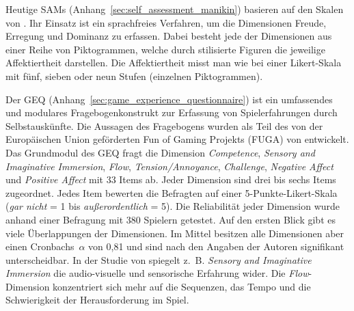 Heutige \ac{SAM}s (Anhang~\ref{sec:self_assessment_manikin}) basieren auf den Skalen von \citet{Lang1980}. Ihr Einsatz ist ein sprachfreies Verfahren, um die Dimensionen Freude, Erregung und Dominanz zu erfassen. Dabei besteht jede der Dimensionen aus einer Reihe von Piktogrammen, welche durch stilisierte Figuren die jeweilige Affektiertheit darstellen. Die Affektiertheit misst man wie bei einer Likert-Skala mit fünf, sieben oder neun Stufen (einzelnen Piktogrammen). 

Der \ac{GEQ} (Anhang~\ref{sec:game_experience_questionnaire}) ist ein umfassendes und modulares Fragebogenkonstrukt zur Erfassung von Spielerfahrungen durch Selbstauskünfte. Die Aussagen des Fragebogens wurden als Teil des von der Europäischen Union geförderten Fun of Gaming Projekts (FUGA) von \citet{Ijsselsteijn2008} entwickelt. Das Grundmodul des \ac{GEQ} fragt die Dimension \emph{Competence}, \emph{Sensory and Imaginative Immersion}, \emph{Flow}, \emph{Tension/Annoyance}, \emph{Challenge}, \emph{Negative Affect} und \emph{Positive Affect} mit 33 Items ab. Jeder Dimension sind drei bis sechs Items zugeordnet. Jedes Item bewerten die Befragten auf einer 5-Punkte-Likert-Skala (\emph{gar nicht} = 1 bis \emph{außerordentlich} = 5). Die Reliabilität jeder Dimension wurde anhand einer Befragung mit 380 Spielern getestet. Auf den ersten Blick gibt es viele Überlappungen der Dimensionen. Im Mittel besitzen alle Dimensionen aber einen Cronbachs~$\alpha$ von 0,81 und sind nach den Angaben der Autoren signifikant unterscheidbar. In der Studie von \citet{Nacke2008} spiegelt z.~B. \emph{Sensory and Imaginative Immersion} die audio-visuelle und sensorische Erfahrung wider. Die \emph{Flow}-Dimension konzentriert sich mehr auf die Sequenzen, das Tempo und die Schwierigkeit der Herausforderung im Spiel.

